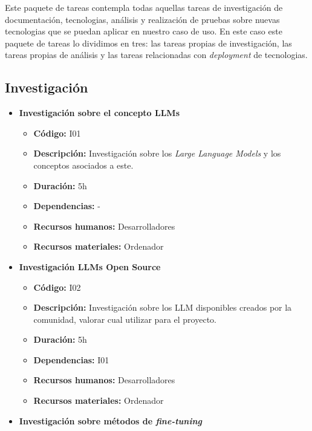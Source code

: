 Este paquete de tareas contempla todas aquellas tareas de investigación de documentación, tecnologias, análisis y realización de pruebas sobre nuevas tecnologias
que se puedan aplicar en nuestro caso de uso. En este caso este paquete de tareas lo dividimos en tres: las tareas propias de investigación, las tareas propias de 
análisis y las tareas relacionadas con \textit{deployment} de tecnologias.

\subsection{Investigación}
\label{subsec:tareas_investigacion}

\begin{itemize}
    \item \textbf{Investigación sobre el concepto LLMs}
        \begin{itemize}
            \item \textbf{Código:} I01
            \item \textbf{Descripción:} Investigación sobre los \textit{Large Language Models} y los conceptos asociados a este.
            \item \textbf{Duración:} 5h
            \item \textbf{Dependencias:} -
            \item \textbf{Recursos humanos:} Desarrolladores
            \item \textbf{Recursos materiales:} Ordenador
        \end{itemize}
    \item \textbf{Investigación LLMs Open Source}
        \begin{itemize}
            \item \textbf{Código:} I02
            \item \textbf{Descripción:} Investigación sobre los LLM disponibles creados por la comunidad, valorar cual utilizar para el proyecto.
            \item \textbf{Duración:} 5h
            \item \textbf{Dependencias:} I01
            \item \textbf{Recursos humanos:} Desarrolladores
            \item \textbf{Recursos materiales:} Ordenador
        \end{itemize}
    \item \textbf{Investigación sobre métodos de \textit{fine-tuning}}
        \begin{itemize}

\end{itemize}
\end{itemize}
